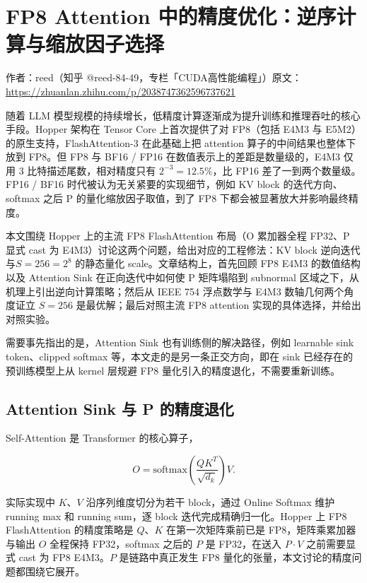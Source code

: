 \chapter{FP8 Attention 中的精度优化：逆序计算与缩放因子选择}

\begin{center}\small 作者：reed（知乎 @reed-84-49，专栏「CUDA高性能编程」）\quad 原文：\url{https://zhuanlan.zhihu.com/p/2038747362596737621}\end{center}

随着 LLM 模型规模的持续增长，低精度计算逐渐成为提升训练和推理吞吐的核心手段。Hopper 架构在 Tensor Core 上首次提供了对 FP8（包括 E4M3 与 E5M2）的原生支持，FlashAttention-3 在此基础上把 attention 算子的中间结果也整体下放到 FP8。但 FP8 与 BF16 / FP16 在数值表示上的差距是数量级的，E4M3 仅用 3 比特描述尾数，相对精度只有 $2^{-3} = 12.5\%$，比 FP16 差了一到两个数量级。FP16 / BF16 时代被认为无关紧要的实现细节，例如 KV block 的迭代方向、softmax 之后 P 的量化缩放因子取值，到了 FP8 下都会被显著放大并影响最终精度。

本文围绕 Hopper 上的主流 FP8 FlashAttention 布局（O 累加器全程 FP32、P 显式 cast 为 E4M3）讨论这两个问题，给出对应的工程修法：KV block 逆向迭代与$S = 256 = 2^8$ 的静态量化 scale。文章结构上，首先回顾 FP8 E4M3 的数值结构以及 Attention Sink 在正向迭代中如何使 P 矩阵塌陷到 subnormal 区域之下，从机理上引出逆向计算策略；然后从 IEEE 754 浮点数学与 E4M3 数轴几何两个角度证立 $S = 256$ 是最优解；最后对照主流 FP8 attention 实现的具体选择，并给出对照实验。

需要事先指出的是，Attention Sink 也有训练侧的解决路径，例如 learnable sink token、clipped softmax 等，本文走的是另一条正交方向，即在 sink 已经存在的预训练模型上从 kernel 层规避 FP8 量化引入的精度退化，不需要重新训练。

\section{Attention Sink 与 P 的精度退化}

Self-Attention 是 Transformer 的核心算子，

\begin{equation*}
O = \mathrm{softmax}\!\left(\frac{QK^T}{\sqrt{d_k}}\right)V.
\end{equation*}

实际实现中 $K$、$V$ 沿序列维度切分为若干 block，通过 Online Softmax 维护 running max 和 running sum，逐 block 迭代完成精确归一化。Hopper 上 FP8 FlashAttention 的精度策略是 $Q$、$K$ 在第一次矩阵乘前已是 FP8，矩阵乘累加器与输出 $O$ 全程保持 FP32，softmax 之后的 $P$ 是 FP32，在送入 $P \cdot V$ 之前需要显式 cast 为 FP8 E4M3。$P$ 是链路中真正发生 FP8 量化的张量，本文讨论的精度问题都围绕它展开。

